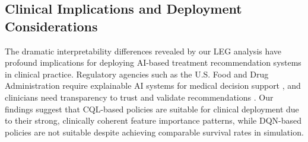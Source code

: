 \subsection{Clinical Implications and Deployment Considerations}\label{sec:discussion:clinical}

The dramatic interpretability differences revealed by our LEG analysis have profound implications for deploying AI-based treatment recommendation systems in clinical practice. Regulatory agencies such as the U.S. Food and Drug Administration require explainable AI systems for medical decision support \citep{holzinger2017xai_healthcare}, and clinicians need transparency to trust and validate recommendations \citep{gottesman2019guidelines}. Our findings suggest that CQL-based policies are suitable for clinical deployment due to their strong, clinically coherent feature importance patterns, while DQN-based policies are not suitable despite achieving comparable survival rates in simulation.

